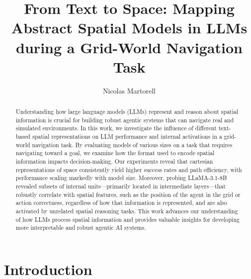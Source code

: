 \documentclass[runningheads]{llncs}
\begin{document}
%
\title{From Text to Space: Mapping Abstract Spatial Models in LLMs during a Grid-World Navigation Task}
%
\author{Nicolas Martorell}
%
%
%
\maketitle              %
%
\begin{abstract}
Understanding how large language models (LLMs) represent and reason about spatial information is crucial for building robust agentic systems that can navigate real and simulated environments. In this work, we investigate the influence of different text-based spatial representations on LLM performance and internal activations in a grid-world navigation task. By evaluating models of various sizes on a task that requires navigating toward a goal, we examine how the format used to encode spatial information impacts decision-making. Our experiments reveal that cartesian representations of space consistently yield higher success rates and path efficiency, with performance scaling markedly with model size. Moreover, probing LLaMA-3.1-8B revealed subsets of internal units—primarily located in intermediate layers—that robustly correlate with spatial features, such as the position of the agent in the grid or action correctness, regardless of how that information is represented, and are also activated by unrelated spatial reasoning tasks. This work advances our understanding of how LLMs process spatial information and provides valuable insights for developing more interpretable and robust agentic AI systems.


\end{abstract}
%
%
%

\section{Introduction}
\end{document}
